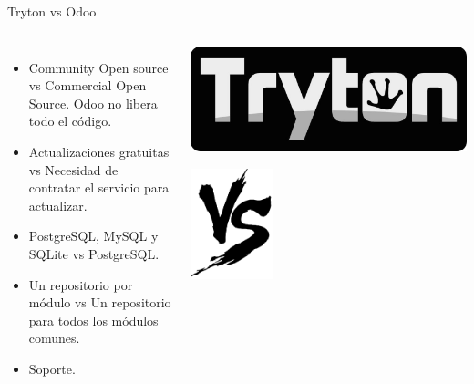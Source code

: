     \begin{frame}{Tryton vs Odoo}
        \fontsize{10}{11}\selectfont

        \begin{columns}
            \begin{itemize}
                \item Community Open source vs Commercial Open Source. Odoo no libera todo el código.
                \item Actualizaciones gratuitas vs Necesidad de contratar el servicio para actualizar.
                \item PostgreSQL, MySQL y SQLite vs PostgreSQL.
                \item Un repositorio por módulo vs Un repositorio para todos los módulos comunes.
                \item Soporte.
            \end{itemize}
            \vspace*{-1cm}
            \begin{center}
                \includegraphics[width=\textwidth]{./Images/Logos/tryton-name.jpg}

                \includegraphics[width=0.3\textwidth]{./Images/vs.png}


\end{center}
\end{columns}
\end{frame}
